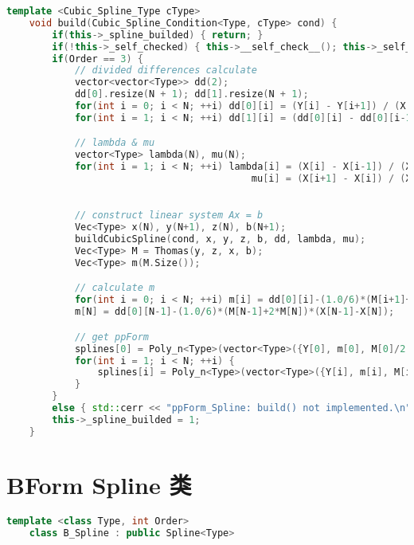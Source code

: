 \documentclass[lang=cn,a4paper,newtx,bibend=bibtex]{elegantpaper}
\begin{document}
\begin{lstlisting}[language = C++]
    template <Cubic_Spline_Type cType>
    void build(Cubic_Spline_Condition<Type, cType> cond) {
        if(this->_spline_builded) { return; }
        if(!this->_self_checked) { this->__self_check__(); this->_self_checked = 1; }
        if(Order == 3) {
			// divided differences calculate
			vector<vector<Type>> dd(2);
			dd[0].resize(N + 1); dd[1].resize(N + 1);
			for(int i = 0; i < N; ++i) dd[0][i] = (Y[i] - Y[i+1]) / (X[i] - X[i+1]);
			for(int i = 1; i < N; ++i) dd[1][i] = (dd[0][i] - dd[0][i-1]) / (X[i+1] - X[i-1]);

			// lambda & mu
			vector<Type> lambda(N), mu(N);
			for(int i = 1; i < N; ++i) lambda[i] = (X[i] - X[i-1]) / (X[i + 1] - X[i - 1]),
										   mu[i] = (X[i+1] - X[i]) / (X[i + 1] - X[i - 1]);

			
			// construct linear system Ax = b
			Vec<Type> x(N), y(N+1), z(N), b(N+1);
			buildCubicSpline(cond, x, y, z, b, dd, lambda, mu);
			Vec<Type> M = Thomas(y, z, x, b);
			Vec<Type> m(M.Size());

			// calculate m
			for(int i = 0; i < N; ++i) m[i] = dd[0][i]-(1.0/6)*(M[i+1]+2*M[i])*(X[i+1]-X[i]);
			m[N] = dd[0][N-1]-(1.0/6)*(M[N-1]+2*M[N])*(X[N-1]-X[N]);

			// get ppForm
			splines[0] = Poly_n<Type>(vector<Type>({Y[0], m[0], M[0]/2.0, (M[1]-M[0])/(X[1]-X[0])/6.0}));
			for(int i = 1; i < N; ++i) {
            	splines[i] = Poly_n<Type>(vector<Type>({Y[i], m[i], M[i]/2.0, (M[i+1]-M[i])/(X[i+1]-X[i])/6.0}));
        	}
		}
        else { std::cerr << "ppForm_Spline: build() not implemented.\n"; return; }
        this->_spline_builded = 1;
    }

\end{lstlisting}

\section{BForm Spline 类}

\begin{lstlisting}[language=C++]
    template <class Type, int Order>
    class B_Spline : public Spline<Type>
\end{lstlisting}
\end{document}
